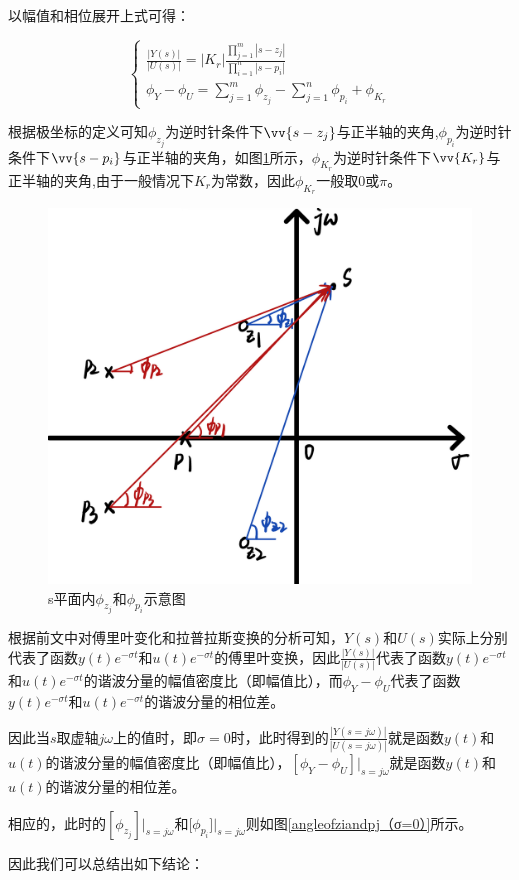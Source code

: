 \documentclass{article}
\numberwithin{equation}{section}
\numberwithin{figure}{section}
\begin{document}
以幅值和相位展开上式可得：

\begin{equation}
    \begin{cases}
       \frac{|Y(s)|}{|U(s)|}=|K_r|\frac{\prod_{j=1}^{m}|s-z_j|}{\prod_{i=1}^{n}|s-p_i|}\\
       \phi_Y-\phi_U=\sum_{j=1}^{m}\phi_{z_j}-\sum_{j=1}^{n}\phi_{p_i}+\phi_{K_r}
    \end{cases}
\end{equation}

根据极坐标的定义可知$\phi_{z_j}$为逆时针条件下$\vv{s-z_j}$与正半轴的夹角,$\phi_{p_i}$为逆时针条件下$\vv{s-p_i}$与正半轴的夹角，如图\ref{angleofziandpj}所示，$\phi_{K_r}$为逆时针条件下$\vv{K_r}$与正半轴的夹角,由于一般情况下$K_r$为常数，因此$\phi_{K_r}$一般取$0$或$\pi$。

\begin{figure}
    \centering
    \includegraphics[width=.4\textwidth]{Chapter6/angleofziandpj.jpg} %
    \caption{s平面内$\phi_{z_j}$和$\phi_{p_i}$示意图} %
    \label{angleofziandpj} %
\end{figure}

根据前文中对傅里叶变化和拉普拉斯变换的分析可知，$Y(s)$和$U(s)$实际上分别代表了函数$y(t)e^{-\sigma t}$和$u(t)e^{-\sigma t}$的傅里叶变换，因此$\frac{|Y(s)|}{|U(s)|}$代表了函数$y(t)e^{-\sigma t}$和$u(t)e^{-\sigma t}$的谐波分量的幅值密度比（即幅值比），而$\phi_Y-\phi_U$代表了函数$y(t)e^{-\sigma t}$和$u(t)e^{-\sigma t}$的谐波分量的相位差。

因此当$s$取虚轴$j\omega$上的值时，即$\sigma=0$时，此时得到的$\frac{|Y(s=j\omega)|}{|U(s=j\omega)|}$就是函数$y(t)$和$u(t)$的谐波分量的幅值密度比（即幅值比），$[\phi_Y-\phi_U]|_{s=j\omega}$就是函数$y(t)$和$u(t)$的谐波分量的相位差。

相应的，此时的$[\phi_{z_j}]|_{s=j\omega}$和[$\phi_{p_i}]|_{s=j\omega}$则如图\ref{angleofziandpj（σ=0）}所示。

因此我们可以总结出如下结论：
\end{document}
